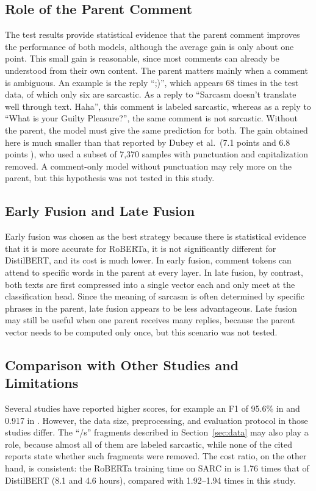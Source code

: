 \documentclass[conference]{IEEEtran}
\begin{document}
\subsection{Role of the Parent Comment}
The test results provide statistical evidence that the parent comment improves the performance of both models, although the average gain is only about one point. This small gain is reasonable, since most comments can already be understood from their own content. The parent matters mainly when a comment is ambiguous. An example is the reply ``;)'', which appears 68 times in the test data, of which only six are sarcastic. As a reply to ``Sarcasm doesn't translate well through text. Haha'', this comment is labeled sarcastic, whereas as a reply to ``What is your Guilty Pleasure?'', the same comment is not sarcastic. Without the parent, the model must give the same prediction for both. The gain obtained here is much smaller than that reported by Dubey et al.\ (7.1 points \cite{dubey2026efficient} and 6.8 points \cite{dubey2025unpacking}), who used a subset of 7,370 samples with punctuation and capitalization removed. A comment-only model without punctuation may rely more on the parent, but this hypothesis was not tested in this study.

\subsection{Early Fusion and Late Fusion}
Early fusion was chosen as the best strategy because there is statistical evidence that it is more accurate for RoBERTa, it is not significantly different for DistilBERT, and its cost is much lower. In early fusion, comment tokens can attend to specific words in the parent at every layer. In late fusion, by contrast, both texts are first compressed into a single vector each and only meet at the classification head. Since the meaning of sarcasm is often determined by specific phrases in the parent, late fusion appears to be less advantageous. Late fusion may still be useful when one parent receives many replies, because the parent vector needs to be computed only once, but this scenario was not tested.

\subsection{Comparison with Other Studies and Limitations}
Several studies have reported higher scores, for example an F1 of 95.6\% in \cite{dubey2026efficient} and 0.917 in \cite{zhang2025enhancing}. However, the data size, preprocessing, and evaluation protocol in those studies differ. The ``/s'' fragments described in Section~\ref{sec:data} may also play a role, because almost all of them are labeled sarcastic, while none of the cited reports state whether such fragments were removed. The cost ratio, on the other hand, is consistent: the RoBERTa training time on SARC in \cite{dubey2026efficient} is 1.76 times that of DistilBERT (8.1 and 4.6 hours), compared with 1.92--1.94 times in this study.
\end{document}
